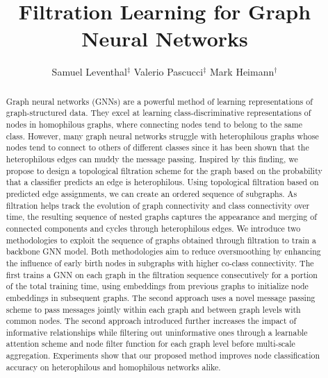 \documentclass[letterpaper]{article} %
\title{Filtration Learning for Graph Neural Networks}
\author{Samuel Leventhal$^{\ddagger}$  \qquad Valerio Pascucci$^{\ddagger}$ \qquad
Mark Heimann$^{\dagger}$}
\begin{document}
\maketitle

 
\begin{abstract}
Graph neural networks (GNNs) are a powerful method of learning representations of graph-structured data. They excel at learning class-discriminative representations of nodes in homophilous graphs, where connecting nodes tend to belong to the same class. However, many graph neural networks struggle with heterophilous graphs whose nodes tend to connect to others of different classes since it has been shown that the heterophilous edges can muddy the message passing.  Inspired by this finding, we propose to design a topological filtration scheme for the graph based on the probability that a classifier predicts an edge is heterophilous. Using topological filtration based on predicted edge assignments, we can create an ordered sequence of subgraphs. As filtration helps track the evolution of graph connectivity and class connectivity over time, the resulting sequence of nested graphs captures the appearance and merging of connected components and cycles through heterophilous edges. We introduce two methodologies to exploit the sequence of graphs obtained through filtration to train a backbone GNN model. Both methodologies aim to reduce oversmoothing by enhancing the influence of early birth nodes in subgraphs with higher co-class connectivity. The first trains a GNN on each graph in the filtration sequence consecutively for a portion of the total training time, using embeddings from previous graphs to initialize node embeddings in subsequent graphs. The second approach uses a novel message passing scheme to pass messages jointly within each graph and between graph levels with common nodes. The second approach introduced further increases the impact of informative relationships while filtering out uninformative ones through a learnable attention scheme and node filter function for each graph level before multi-scale aggregation. Experiments show that our proposed method improves node classification accuracy on heterophilous and homophilous networks alike.

\iffalse
\mh{Too long and difficult to read for an abstract (this reads more like the introduction to a paper, although it should have paragraph breaks for that). Should be 1 short to medium length paragraph. Good abstract template you can use for an ML paper:
\\ Sentence 1: we're studying an important problem
\\ Sentence 2: powerful methods have been introduced to solve this problem (optional: they often work well because...)
\\ Sentence 3: alas, such methods suffer from a limitation
\\ Sentence 4: we have a great idea to fix this limitation
\\ Sentence 5: here is what our method does
\\ Sentence 6: experiments show that our method is good in this way(s) (be as specific as possible)
}
\fi

\end{abstract}
\end{document}

